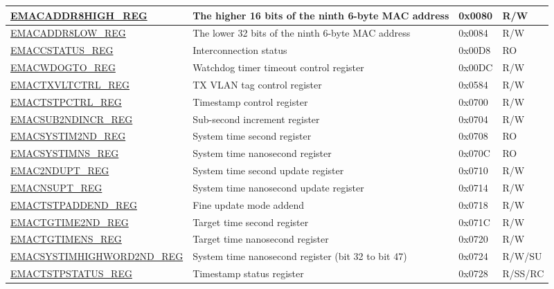 \begin{longtable}{ |m{6cm} |m{5.3cm} | m{2cm} | m{2.2cm} | }
\hyperref[regdesc:EMACADDR8HIGHREG]{EMACADDR8HIGH\_REG} &  The higher 16 bits of the ninth 6-byte MAC address & 0x0080 & R/W \\ \hline
\hyperref[regdesc:EMACADDR8LOWREG]{EMACADDR8LOW\_REG} & The lower 32 bits of the ninth 6-byte MAC address & 0x0084 & R/W \\ \hline

\hyperref[regdesc:EMACCSTATUSREG]{EMACCSTATUS\_REG} &  Interconnection status & 0x00D8 & RO \\ \hline
\hyperref[regdesc:EMACWDOGTOREG]{EMACWDOGTO\_REG} & Watchdog timer timeout control register & 0x00DC & R/W \\ \hline

\hyperref[regdesc:EMACTXVLANTAGCONTROLREG]{EMACTXVLTCTRL\_REG} & TX VLAN tag control register & 0x0584 & R/W \\ \hline

\hyperref[regdesc:EMACTIMESTAMPCONTROLREG]{EMACTSTPCTRL\_REG} & Timestamp control register & 0x0700 & R/W \\ \hline

\hyperref[regdesc:EMACSUBSECONDINCRREG]{EMACSUB2NDINCR\_REG} & Sub-second increment register & 0x0704 & R/W \\ \hline

\hyperref[regdesc:EMACSYSTEMTIMESREG]{EMACSYSTIM2ND\_REG} & System time second register & 0x0708 & RO \\ \hline
\hyperref[regdesc:EMACSYSTEMTIMENANOSSREG]{EMACSYSTIMNS\_REG} & System time nanosecond register& 0x070C & RO \\ \hline

\hyperref[regdesc:EMACSECONDSUPDATEREG]{EMAC2NDUPT\_REG} & System time second update register& 0x0710 & R/W \\ \hline

\hyperref[regdesc:EMACNANOSUPDATEREG]{EMACNSUPT\_REG} & System time nanosecond update register& 0x0714 & R/W \\ \hline
\hyperref[regdesc:EMACTIMESTAMPADDENDREG]{EMACTSTPADDEND\_REG} & Fine update mode addend & 0x0718 & R/W \\ \hline

\hyperref[regdesc:EMACTARGETTIMESECONDREG]{EMACTGTIME2ND\_REG} & Target time second register & 0x071C & R/W \\ \hline

\hyperref[regdesc:EMACTARGETTIMENANOSREG]{EMACTGTIMENS\_REG} & Target time nanosecond register& 0x0720 & R/W \\ \hline

\hyperref[regdesc:EMACSYSTEMTIMEHIGHERWORDSECONDREG]{EMACSYSTIMHIGHWORD2ND\_REG} & System time nanosecond register (bit 32 to bit 47) & 0x0724 & R/W/SU \\ \hline

\hyperref[regdesc:EMACTIMESTAMPSTATUSREG]{EMACTSTPSTATUS\_REG} & Timestamp status register & 0x0728 & R/SS/RC \\ \hline


\end{longtable}

